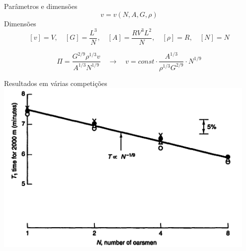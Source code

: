 \documentclass{beamer}
\begin{document}
\begin{frame}{Parâmetros e dimensões}
  \[
  v = v(N, A, G, \rho)
  \]
  Dimensões
  \[
    [v] = V, \quad [G] = \frac{L^3}{N}, \quad [A] = \frac{R V^3 L^2}{N}, \quad [\rho] = R, \quad [N] = N
    \]

    \[
    \Pi = \frac{G^{2/9}\rho^{1/3} v }{A^{1/3} N^{1/9}} \quad\longrightarrow\quad v = const \cdot \frac{A^{1/3}}{\rho^{1/3}G^{2/9}}\cdot N^{1/9}
    \]
    
  
\end{frame}

\begin{frame}{Resultados em várias competições}
  \centering
  \includegraphics[width=0.95\textwidth]{./figuras/remo.png}
\end{frame}
\end{document}
